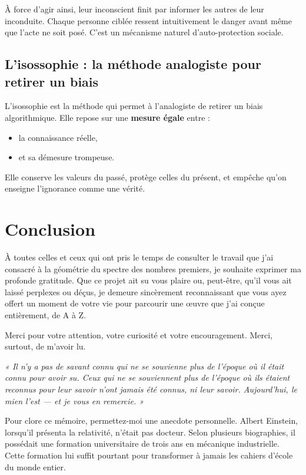 \documentclass[12pt,oneside]{article}
\begin{document}
À force d'agir ainsi, leur inconscient finit par informer les autres de leur inconduite.  
Chaque personne ciblée ressent intuitivement le danger avant même que l'acte ne soit posé.  
C'est un mécanisme naturel d'auto-protection sociale.

\subsection{L'isossophie : la méthode analogiste pour retirer un biais}

L'isossophie est la méthode qui permet à l'analogiste de retirer un biais algorithmique.  
Elle repose sur une \textbf{mesure égale} entre :

\begin{itemize}
    \item la connaissance réelle,  
    \item et sa démesure trompeuse.  
\end{itemize}

Elle conserve les valeurs du passé, protège celles du présent, et empêche qu'on enseigne l'ignorance comme une vérité.

\section*{Conclusion}

À toutes celles et ceux qui ont pris le temps de consulter le travail que j'ai consacré à la géométrie du spectre des nombres premiers, je souhaite exprimer ma profonde gratitude. Que ce projet ait su vous plaire ou, peut-être, qu'il vous ait laissé perplexes ou déçus, je demeure sincèrement reconnaissant que vous ayez offert un moment de votre vie pour parcourir une œuvre que j'ai conçue entièrement, de A à Z.

Merci pour votre attention, votre curiosité et votre encouragement. Merci, surtout, de m'avoir lu.

\bigskip

\noindent\textit{« Il n'y a pas de savant connu qui ne se souvienne plus de l'époque où il était connu pour avoir su. Ceux qui ne se souviennent plus de l'époque où ils étaient reconnus pour leur savoir n'ont jamais été connus, ni leur savoir. Aujourd'hui, le mien l'est --- et je vous en remercie. »}

\bigskip

Pour clore ce mémoire, permettez-moi une anecdote personnelle.  
Albert Einstein, lorsqu'il présenta la relativité, n'était pas docteur. Selon plusieurs biographies, il possédait une formation universitaire de trois ans en mécanique industrielle. Cette formation lui suffit pourtant pour transformer à jamais les cahiers d'école du monde entier.
\end{document}
